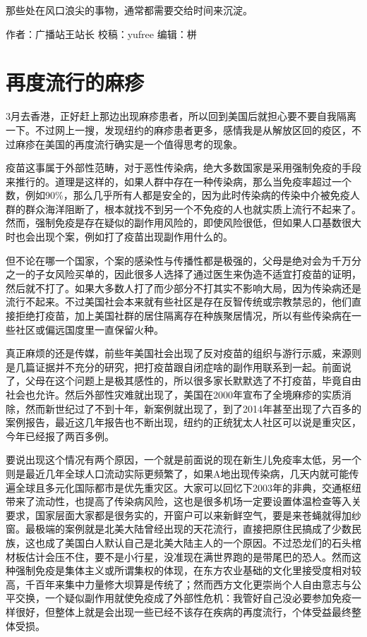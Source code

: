 \documentclass[]{book}
\begin{document}
那些处在风口浪尖的事物，通常都需要交给时间来沉淀。

作者：广播站王站长
校稿：yufree
编辑：栟

\hypertarget{ux518dux5ea6ux6d41ux884cux7684ux9ebbux75b9}{%
\section{再度流行的麻疹}\label{ux518dux5ea6ux6d41ux884cux7684ux9ebbux75b9}}

3月去香港，正好赶上那边出现麻疹患者，所以回到美国后就担心要不要自我隔离一下。不过网上一搜，发现纽约的麻疹患者更多，感情我是从解放区回的疫区，不过麻疹在美国的再度流行确实是一个值得思考的现象。

疫苗这事属于外部性范畴，对于恶性传染病，绝大多数国家是采用强制免疫的手段来推行的。道理是这样的，如果人群中存在一种传染病，那么当免疫率超过一个数，例如90\%，那么几乎所有人都是安全的，因为此时传染病的传染中介被免疫人群的群众海洋阻断了，根本就找不到另一个不免疫的人也就实质上流行不起来了。然而，强制免疫是存在疑似的副作用风险的，即使风险很低，但如果人口基数很大时也会出现个案，例如打了疫苗出现副作用什么的。

但不论在哪一个国家，个案的感染性与传播性都是极强的，父母是绝对会为千万分之一的子女风险买单的，因此很多人选择了通过医生来伪造不适宜打疫苗的证明，然后就不打了。如果大多数人打了而少部分不打其实不影响大局，因为传染病还是流行不起来。不过美国社会本来就有些社区是存在反智传统或宗教禁忌的，他们直接拒绝打疫苗，加上美国社群的居住隔离存在种族聚居情况，所以有些传染病在一些社区或偏远国度里一直保留火种。

真正麻烦的还是传媒，前些年美国社会出现了反对疫苗的组织与游行示威，来源则是几篇证据并不充分的研究，把打疫苗跟自闭症啥的副作用联系到一起。前面说了，父母在这个问题上是极其感性的，所以很多家长默默选了不打疫苗，毕竟自由社会也允许。然后外部性灾难就出现了，美国在2000年宣布了全境麻疹的实质消除，然而新世纪过了不到十年，新案例就出现了，到了2014年甚至出现了六百多的案例报告，最近这几年报告也不断出现，纽约的正统犹太人社区可以说是重灾区，今年已经报了两百多例。

要说出现这个情况有两个原因，一个就是前面说的现在新生儿免疫率太低，另一个则是最近几年全球人口流动实际更频繁了，如果A地出现传染病，几天内就可能传遍全球且多元化国际都市是优先重灾区。大家可以回忆下2003年的非典，交通枢纽带来了流动性，也提高了传染病风险，这也是很多机场一定要设置体温检查等入关要求，国家层面大家都是很务实的，开窗户可以来新鲜空气，要是来苍蝇就得加纱窗。最极端的案例就是北美大陆曾经出现的天花流行，直接把原住民搞成了少数民族，这也成了美国白人默认自己是北美大陆主人的一个原因。不过恐龙们的石头棺材板估计会压不住，要不是小行星，没准现在满世界跑的是带尾巴的恐人。然而这种强制免疫是集体主义或所谓集权的体现，在东方农业基础的文化里接受度相对较高，千百年来集中力量修大坝算是传统了；然而西方文化更崇尚个人自由意志与公平交换，一个疑似副作用就使免疫成了外部性危机：我管好自己没必要参加免疫一样很好，但整体上就是会出现一些已经不该存在疾病的再度流行，个体受益最终整体受损。
\end{document}
